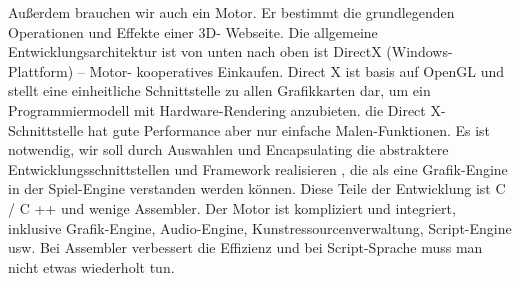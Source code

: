 Außerdem brauchen wir auch ein Motor. Er bestimmt die grundlegenden Operationen und Effekte einer 3D- Webseite. Die allgemeine Entwicklungsarchitektur ist von unten nach oben ist  DirectX (Windows-Plattform) – Motor- kooperatives Einkaufen. Direct X ist basis auf OpenGL und  stellt eine einheitliche Schnittstelle zu allen Grafikkarten dar, um ein Programmiermodell mit Hardware-Rendering anzubieten. die Direct X-Schnittstelle hat gute Performance aber  nur einfache Malen-Funktionen.  Es ist notwendig, wir soll  durch Auswahlen und Encapsulating  die abstraktere  Entwicklungsschnittstellen und Framework  realisieren , die als eine Grafik-Engine in der Spiel-Engine verstanden werden können. Diese  Teile der Entwicklung ist C / C ++ und wenige Assembler. Der Motor ist kompliziert und integriert, inklusive Grafik-Engine, Audio-Engine, Kunstressourcenverwaltung, Script-Engine usw. Bei  Assembler verbessert die Effizienz und bei Script-Sprache muss man nicht etwas wiederholt tun.
